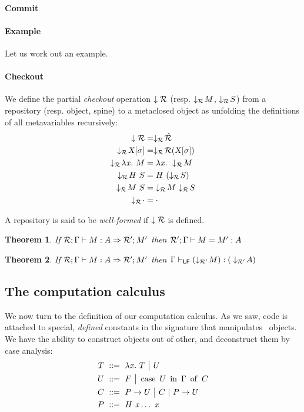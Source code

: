 \documentclass[9pt]{sigplanconf}
\newtheorem{theorem}{Theorem}
\begin{document}
\paragraph{Commit}

\paragraph{Example}

Let us work out an example.

\paragraph{Checkout}

We define the partial \emph{checkout} operation $\downarrow{\mathcal{R}}$
(resp. $\downarrow_{\mathcal{R}}\!{M}$, $\downarrow_{\mathcal{R}}\!{S}$) from a repository
(resp. object, spine) to a metaclosed object as unfolding the
definitions of all metavariables recursively:
\begin{align*}
  \checkout{\mr} &= \checkoutr{\hat{\mr}} \\
  \checkoutr{\smeta X \sigma} &= \checkoutr{\mr(\smeta X\sigma)}\\
  \checkoutr{\lam x M} &= \lam x \checkoutr{M} \\
  \checkoutr{\app H S} &= \app H {(\checkoutr{S})} \\
  \checkoutr{\spinecons M S} &= \spinecons {\checkoutr M} {\checkoutr S} \\
  \checkoutr{\spinenil} &= \spinenil
\end{align*}

A repository is said to be \emph{well-formed} if $\downarrow{\mathcal{R}}$
is defined.

\begin{theorem}
  If \/ ${{\mathcal{R}}; {\Gamma}}\vdash{{{{M}: {A}}}\Rightarrow{{\mathcal{R'}}; {M'}}}$ then \/ ${{\mathcal{R'}}; {\Gamma}}\vdash{{M}={M'}:{A}}$
\end{theorem}

\begin{theorem}
  If \/ ${{\mathcal{R}}; {\Gamma}}\vdash{{{{M}: {A}}}\Rightarrow{{\mathcal{R'}}; {M'}}}$ then \/ ${\Gamma}\vdash_{\text{\rm\sf{LF}}}{{(\downarrow_{\mathcal{R'}}\!{M})}:{(}}\downarrow_{\mathcal{R'}}\!{A})$
\end{theorem}

\subsection{The computation calculus}
\label{sec:computational-calculus}

We now turn to the definition of our computation calculus. As we saw,
code is attached to special, \emph{defined} constants in the signature
that manipulates \LF\ objects. We have the ability to construct
objects out of other, and deconstruct them by case analysis:
\begin{align*}
  T &\ ::=\ 
  \lambda{\ensuremath{\text{\textit{x}}}}.\  T \ {\big|}\ 
  U \\
  U &\ ::=\ 
  F \ {\big|}\ 
  \operatorname{case}\ {{U}\ \operatorname{in}\ {\Gamma}}\ \operatorname{of}\  C \\
  C &\ ::=\  {P}\to U \ {\big|}\ 
  C\ |\ {P}\to U \\
  P &\ ::=\ 
  {H}\  {\text{\textit{x}}} \ldots\ {\text{\textit{x}}}
\end{align*}
\end{document}
